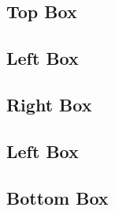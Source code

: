 \documentclass[a4paper, 11pt]{article}
\begin{document}
\begin{posterblock}
  \section{Top Box}
  \lipsum[1]
\end{posterblock}

\begin{adjmulticols}{2}{0pt}{0pt}

  \begin{posterblock}
    \section{Left Box}
    \lipsum[2]
  \end{posterblock}

  \begin{posterblock}
    \section{Right Box}
    \lipsum[3]
  \end{posterblock}

  \begin{posterblock}
    \section{Left Box}
    \lipsum[4]
  \end{posterblock}

\end{adjmulticols}

\begin{posterblock}
  \section{Bottom Box}
  \lipsum[5]
\end{posterblock}
\end{document}
